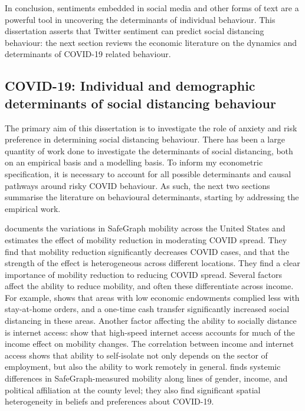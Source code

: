 \documentclass{article}
\begin{document}
In conclusion, sentiments embedded in social media and other forms of text are a powerful tool in uncovering the determinants of individual behaviour. This dissertation asserts that Twitter sentiment can predict social distancing behaviour: the next section reviews the economic literature on the dynamics and determinants of COVID-19 related behaviour.
\subsection{COVID-19: Individual and demographic determinants of social distancing behaviour}
The primary aim of this dissertation is to investigate the role of anxiety and risk preference in determining social distancing behaviour. There has been a large quantity of work done to investigate the determinants of social distancing, both on an empirical basis and a modelling basis. To inform my econometric specification, it is necessary to account for all possible determinants and causal pathways around risky COVID behaviour. As such, the next two sections summarise the literature on behavioural determinants, starting by addressing the empirical work.

\textcite{glaeserHowMuchDoes2020} documents the variations in SafeGraph mobility across the United States and estimates the effect of mobility reduction in moderating COVID spread. They find that mobility reduction significantly decreases COVID cases, and that the strength of the effect is heterogeneous across different locations. They find a clear importance of mobility reduction to reducing COVID spread. Several factors affect the ability to reduce mobility, and often these differentiate across income. For example, \textcite{wrightPovertyEconomicDislocation2020} shows that areas with low economic endowments complied less with stay-at-home orders, and a one-time cash transfer significantly increased social distancing in these areas. Another factor affecting the ability to socially distance is internet access: \textcite{chiouSocialDistancingInternet2020} show that high-speed internet access accounts for much of the income effect on mobility changes. The correlation between income and internet access shows that ability to self-isolate not only depends on the sector of employment, but also the ability to work remotely in general. \textcite{fanHeterogeneousActionsBeliefs2020} finds systemic differences in SafeGraph-measured mobility along lines of gender, income, and political affiliation at the county level; they also find significant spatial heterogeneity in beliefs and preferences about COVID-19.
\end{document}
